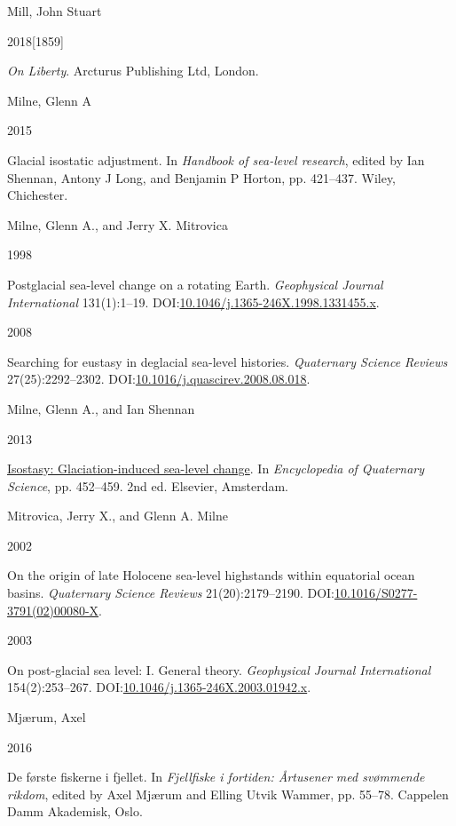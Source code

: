 \documentclass[
  12pt,
  a4paper,
  oneside]{book}
\newlength{\cslhangindent}
\newlength{\csllabelwidth}
\newlength{\cslentryspacingunit} %
\newenvironment{CSLReferences}[2] %
 {%
  \setlength{\parindent}{0pt}
  \ifodd #1
  \let\oldpar\par
  \def\par{\hangindent=\cslhangindent\oldpar}
  \fi
  \setlength{\parskip}{#2\cslentryspacingunit}
 }%
 {}
\newcommand{\CSLBlock}[1]{#1\hfill\break}
\newcommand{\CSLLeftMargin}[1]{\parbox[t]{\csllabelwidth}{#1}}
\newcommand{\CSLRightInline}[1]{\parbox[t]{\linewidth - \csllabelwidth}{#1}\break}
\begin{document}
\begin{CSLReferences}{0}{0}
\leavevmode{}%
\CSLBlock{Mill, John Stuart}
\CSLLeftMargin{ 2018{[}1859{]}}%
\CSLRightInline{\emph{{On Liberty}}. Arcturus Publishing Ltd, London.}

\leavevmode{}%
\CSLBlock{Milne, Glenn A}
\CSLLeftMargin{ 2015}%
\CSLRightInline{Glacial isostatic adjustment. In \emph{Handbook of sea-level research}, edited by Ian Shennan, Antony J Long, and Benjamin P Horton, pp. 421--437. Wiley, Chichester.}

\leavevmode{}%
\CSLBlock{Milne, Glenn A., and Jerry X. Mitrovica}
\CSLLeftMargin{ 1998}%
\CSLRightInline{Postglacial sea-level change on a rotating Earth. \emph{Geophysical Journal International} 131(1):1--19. DOI:\href{https://doi.org/10.1046/j.1365-246X.1998.1331455.x}{10.1046/j.1365-246X.1998.1331455.x}.}

\leavevmode{}%
\CSLLeftMargin{ 2008 }%
\CSLRightInline{Searching for eustasy in deglacial sea-level histories. \emph{Quaternary Science Reviews} 27(25):2292--2302. DOI:\href{https://doi.org/10.1016/j.quascirev.2008.08.018}{10.1016/j.quascirev.2008.08.018}.}

\leavevmode{}%
\CSLBlock{Milne, Glenn A., and Ian Shennan}
\CSLLeftMargin{ 2013}%
\CSLRightInline{\href{https://doi.org/10.1016/B978-0-444-53643-3.00135-7}{Isostasy: Glaciation-induced sea-level change}. In \emph{{Encyclopedia of Quaternary Science}}, pp. 452--459. 2nd ed. Elsevier, Amsterdam.}

\leavevmode{}%
\CSLBlock{Mitrovica, Jerry X., and Glenn A. Milne}
\CSLLeftMargin{ 2002}%
\CSLRightInline{{On the origin of late Holocene sea-level highstands within equatorial ocean basins}. \emph{Quaternary Science Reviews} 21(20):2179--2190. DOI:\href{https://doi.org/10.1016/S0277-3791(02)00080-X}{10.1016/S0277-3791(02)00080-X}.}

\leavevmode{}%
\CSLLeftMargin{ 2003 }%
\CSLRightInline{{On post-glacial sea level: I. General theory}. \emph{Geophysical Journal International} 154(2):253--267. DOI:\href{https://doi.org/10.1046/j.1365-246X.2003.01942.x}{10.1046/j.1365-246X.2003.01942.x}.}

\leavevmode{}%
\CSLBlock{Mjærum, Axel}
\CSLLeftMargin{ 2016}%
\CSLRightInline{{De første fiskerne i fjellet}. In \emph{{Fjellfiske i fortiden: Årtusener med svømmende rikdom}}, edited by Axel Mjærum and Elling Utvik Wammer, pp. 55--78. Cappelen Damm Akademisk, Oslo.}


\end{CSLReferences}
\end{document}
